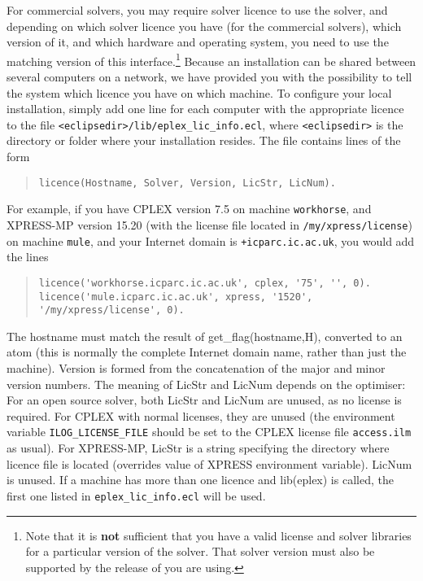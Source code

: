 For commercial solvers, you may require solver licence to use the solver, and
depending on which solver licence you have (for the commercial solvers), 
which version of it, and which hardware and operating system,
you need to use the matching version of this interface.\footnote{Note that
it is {\bf not} sufficient that you have a valid license and solver
libraries for a particular version of the solver. That solver version must
also be supported by the release of {\eclipse} you are using.}
Because an {\eclipse} installation can be shared between several
computers on a network, we have provided you with the possibility
to tell the system which licence you have on which machine.
To configure your local installation, simply add one line for
each computer with the appropriate licence to the file
\verb+<eclipsedir>/lib/eplex_lic_info.ecl+, where \verb+<eclipsedir>+
is the directory or folder where your {\eclipse} installation resides.
The file contains lines of the form
\begin{quote} \begin{verbatim}
licence(Hostname, Solver, Version, LicStr, LicNum).
\end{verbatim} \end{quote}
For example, if you have CPLEX version 7.5 on machine \verb+workhorse+,
and XPRESS-MP version 15.20 (with the license file located in
\verb'/my/xpress/license') on machine \verb+mule+, and your Internet
domain is \verb'+icparc.ic.ac.uk',
you would add the lines
\begin{quote} \begin{verbatim}
licence('workhorse.icparc.ic.ac.uk', cplex, '75', '', 0).
licence('mule.icparc.ic.ac.uk', xpress, '1520', '/my/xpress/license', 0).         
\end{verbatim} \end{quote}
The hostname must match the result of get_flag(hostname,H),
converted to an atom (this is normally the complete Internet domain name,
rather than just the machine).
Version is formed from the concatenation of the major and minor version
numbers. 
The meaning of LicStr and LicNum depends on the optimiser:
For an open source solver, both LicStr and LicNum are unused, as no license
is required.
For CPLEX with normal licenses, they are unused (the environment
variable \verb'ILOG_LICENSE_FILE' should be set to the CPLEX
license file \verb'access.ilm' as usual). 
For XPRESS-MP,
LicStr is a string specifying the directory where
licence file is located (overrides value of XPRESS environment
variable). LicNum is unused. %
If a machine has more than one licence and lib(eplex) is called, the
first one listed in \verb+eplex_lic_info.ecl+ will be used.

